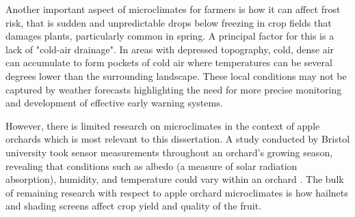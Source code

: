 Another important aspect of microclimates for farmers is how it can affect frost
risk, that is sudden and unpredictable drops below freezing in crop fields that
damages plants, particularly common in spring. A principal factor for this is a
lack of "cold-air drainage". In areas with depressed topography, cold, dense air
can accumulate to form pockets of cold air where temperatures can be several
degrees lower than the surrounding landscape\cite{drepper2022}. These local
conditions may not be captured by weather forecasts highlighting the need for
more precise monitoring and development of effective early warning systems.

However, there is limited research on microclimates in the context of apple
orchards which is most relevant to this dissertation. A study conducted by
Bristol university took sensor measurements throughout an orchard's growing
season, revealing that conditions such as albedo (a measure of solar radiation
absorption), humidity, and temperature could vary within an orchard
\cite{landsberg1973}. The bulk of remaining research with respect to apple
orchard microclimates is how hailnets and shading screens affect crop yield and
quality of the fruit.


